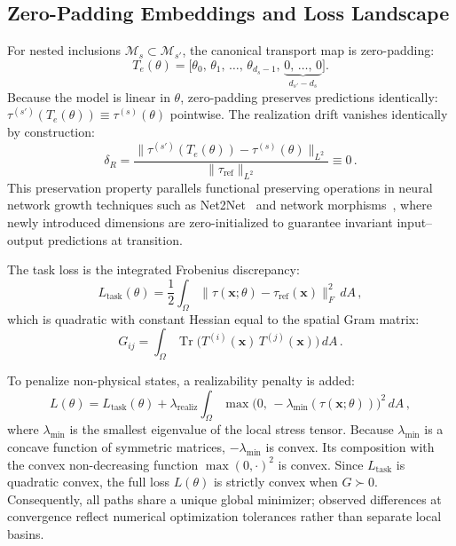 \documentclass[preprint,aps,prb,longbibliography,superscriptaddress]{revtex4-2}
\newcommand{\bx}{\mathbf{x}}
\newcommand{\Tr}{\operatorname{Tr}}
\newcommand{\dR}{\delta_R}
\newcommand{\tref}{\tau_{\text{ref}}}
\begin{document}
\subsection{Zero-Padding Embeddings and Loss Landscape}
\label{sec:embedding}

For nested inclusions $\mathcal{M}_s \subset \mathcal{M}_{s'}$, the canonical
transport map is zero-padding:
\begin{equation}\label{eq:transport}
  T_e(\theta) = \bigl[\theta_0,\, \theta_1,\, \dotsc,\,
    \theta_{d_s-1},\,
    \underbrace{0,\, \dotsc,\, 0}_{d_{s'}-d_s}\bigr].
\end{equation}
Because the model is linear in $\theta$, zero-padding preserves predictions
identically: $\tau^{(s')}(T_e(\theta)) \equiv \tau^{(s)}(\theta)$ pointwise.
The realization drift vanishes identically by construction:
\begin{equation}\label{eq:drift}
  \dR = \frac{\|\tau^{(s')}(T_e(\theta)) - \tau^{(s)}(\theta)\|_{L^2}}
             {\|\tref\|_{L^2}} \equiv 0\,.
\end{equation}
This preservation property parallels functional preserving operations in neural
network growth techniques such as Net2Net~\cite{Chen2016} and network morphisms~\cite{Wei2016},
where newly introduced dimensions are zero-initialized to guarantee invariant
input--output predictions at transition.

The task loss is the integrated Frobenius discrepancy:
\begin{equation}\label{eq:task_loss}
  L_{\text{task}}(\theta) = \frac{1}{2}\int_\Omega
  \|\tau(\bx;\theta) - \tref(\bx)\|_F^2\,dA\,,
\end{equation}
which is quadratic with constant Hessian equal to the spatial Gram matrix:
\begin{equation}\label{eq:gram}
  G_{ij} = \int_\Omega \Tr\bigl(T^{(i)}(\bx)\, T^{(j)}(\bx)\bigr)\,dA\,.
\end{equation}

To penalize non-physical states, a realizability penalty is added:
\begin{equation}\label{eq:penalty}
  L(\theta) = L_{\text{task}}(\theta)
  + \lambda_{\mathrm{realiz}}
    \int_\Omega \max\!\bigl(0,\, -\lambda_{\min}(\tau(\bx;\theta))\bigr)^2\,dA\,,
\end{equation}
where $\lambda_{\min}$ is the smallest eigenvalue of the local stress tensor.
Because $\lambda_{\min}$ is a concave function of symmetric matrices,
$-\lambda_{\min}$ is convex. Its composition with the convex non-decreasing
function $\max(0,\cdot)^2$ is convex. Since $L_{\text{task}}$ is quadratic
convex, the full loss $L(\theta)$ is strictly convex when $G \succ 0$.
Consequently, all paths share a unique global minimizer; observed differences at
convergence reflect numerical optimization tolerances rather than separate
local basins.
\end{document}
